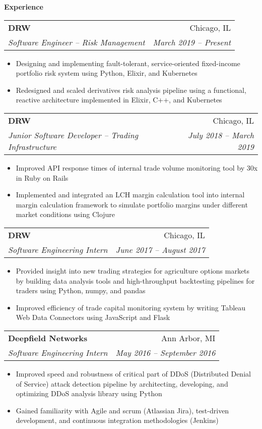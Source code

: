 \documentclass[letterpaper,11pt]{article}
\makeatletter
\newcommand{\resitem}[1]{\item #1 \vspace{-2pt}}
\newcommand{\resheading}[1]{{\large \colorbox{mygrey}{\begin{minipage}{\textwidth}{\textbf{#1 \vphantom{p\^{E}}}}\end{minipage}}}}
\newcommand{\ressubheading}[4]{
\begin{tabular*}{6.875in}{l@{\extracolsep{\fill}}r}
		\textbf{#1} & #2 \\
		\textit{#3} & \textit{#4} \\
\end{tabular*}\vspace{-6pt}}
\renewcommand{\footnotesize}{\fontsize{10pt}{11pt}\selectfont}
\makeatother
\begin{document}
		\resheading{Experience}
		\begin{description}
			\item
			\ressubheading{DRW}{Chicago, IL}
			{Software Engineer -- Risk Management}{March 2019 -- Present}
			{	
				\footnotesize
				\begin{itemize}
					\resitem{Designing and implementing fault-tolerant, service-oriented fixed-income portfolio risk system using Python, Elixir, and Kubernetes}
					\resitem{Redesigned and scaled derivatives risk analysis pipeline using a functional, reactive architecture implemented in Elixir, C++, and Kubernetes}
				\end{itemize}
			}
			\item
			\ressubheading{DRW}{Chicago, IL}
			{Junior Software Developer -- Trading Infrastructure}{July 2018 -- March 2019}
			{	
				\footnotesize
				\begin{itemize}
					\resitem{Improved API response times of internal trade volume monitoring tool by 30x in Ruby on Rails}
					\resitem{Implemented and integrated an LCH margin calculation tool into internal margin calculation framework to simulate portfolio margins under different market conditions using Clojure}
				\end{itemize}
			}
			\item 
			\ressubheading{DRW}{Chicago, IL}
			{Software Engineering Intern}{June 2017 -- August 2017}
			{	
				\footnotesize
				\begin{itemize}
					\resitem{Provided insight into new trading strategies for agriculture options markets by building data analysis tools and high-throughput backtesting pipelines for traders using Python, numpy, and pandas}
					\resitem{Improved efficiency of trade capital monitoring system by writing Tableau Web Data Connectors using JavaScript and Flask}
				\end{itemize}
			}
			\item 
			\ressubheading{Deepfield Networks}{Ann Arbor, MI}
			{Software Engineering Intern}{May 2016 -- September 2016}
			{	
				\footnotesize
				\begin{itemize}
					\resitem{Improved speed and robustness of critical part of DDoS (Distributed Denial of Service) attack detection pipeline by architecting, developing, and optimizing DDoS analysis library using Python}
					\resitem{Gained familiarity with Agile and scrum (Atlassian Jira), test-driven development, and continuous integration methodologies (Jenkins)}
				\end{itemize}
			}						
		\end{description}  %
						
\end{document}
